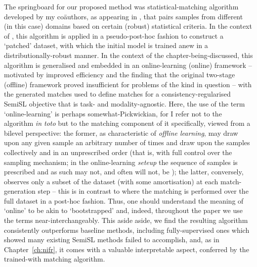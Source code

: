 The springboard for our proposed method was statistical-matching algorithm developed by my
co{\"a}uthors, as appearing in \citet{RomInsShaQua22}, that pairs samples from different (in this
case) domains based on certain (robust) statistical criteria. 
%
In the context of \citet{RomInsShaQua22}, this algorithm is applied in a pseudo-post-hoc fashion to
construct a `patched' dataset, with which the initial model is trained anew in a
distributionally-robust manner.
%
In the context of the chapter-being-discussed, this algorithm is generalised and embedded in an
online-learning (online) framework -- motivated by improved efficiency and the finding that the
original two-stage (offline) framework proved insufficient for problems of the kind in question --
with the generated matches used to define matches for a consistency-regularised \ac{SemiSL}
objective that is task- and modality-agnostic.
%
Here, the use of the term `online-learning' is perhaps somewhat-Pickwickian, for I refer not to the
algorithm \emph{in toto} but to the matching component of it specifically, viewed from a bilevel
perspective: the former, as characteristic of \emph{offline learning}, may draw upon any given
sample an arbitrary number of times and draw upon the samples collectively and in an unprescribed
order (that is, with full control over the sampling mechanism; in the online-learning \emph{seteup}
the sequence of samples is prescribed and as such may not, and often will not, be \iid{}); the
latter, conversely, observes only a subset of the dataset (with some amortisation) at each
match-generation step -- this is in contrast to \citet{RomInsShaQua22} where the matching is
performed over the full dataset in a post-hoc fashion.
%
Thus, one should understand the meaning of `online' to be akin to `bootstrapped' and, indeed,
throughout the paper we use the terms near-interchangeably.
%
This aside aside, we find the resulting algorithm consistently outperforms baseline methods,
including fully-supervised ones which \citet{SagWeiLeeGaoetal22} showed many existing \ac{SemiSL}
methods failed to accomplish, and, as in Chapter~\ref{ch:nifr}, it comes with a valuable
interpretable aspect, conferred by the trained-with matching algorithm.

%
